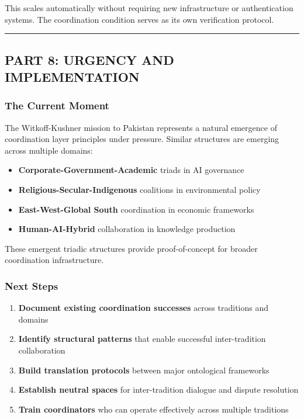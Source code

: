 \documentclass[
]{article}
\providecommand{\tightlist}{%
  \setlength{\itemsep}{0pt}\setlength{\parskip}{0pt}}
\begin{document}
This scales automatically without requiring new infrastructure or
authentication systems. The coordination condition serves as its own
verification protocol.

\begin{center}\rule{0.5\linewidth}{0.5pt}\end{center}

\subsection{PART 8: URGENCY AND
IMPLEMENTATION}\label{part-8-urgency-and-implementation}

\subsubsection{The Current Moment}\label{the-current-moment-1}

The Witkoff-Kushner mission to Pakistan represents a natural emergence
of coordination layer principles under pressure. Similar structures are
emerging across multiple domains:

\begin{itemize}
\tightlist
\item
  \textbf{Corporate-Government-Academic} triads in AI governance
\item
  \textbf{Religious-Secular-Indigenous} coalitions in environmental
  policy\\
\item
  \textbf{East-West-Global South} coordination in economic frameworks
\item
  \textbf{Human-AI-Hybrid} collaboration in knowledge production
\end{itemize}

These emergent triadic structures provide proof-of-concept for broader
coordination infrastructure.

\subsubsection{Next Steps}\label{next-steps}

\begin{enumerate}
\def\labelenumi{\arabic{enumi}.}
\tightlist
\item
  \textbf{Document existing coordination successes} across traditions
  and domains
\item
  \textbf{Identify structural patterns} that enable successful
  inter-tradition collaboration\\
\item
  \textbf{Build translation protocols} between major ontological
  frameworks
\item
  \textbf{Establish neutral spaces} for inter-tradition dialogue and
  dispute resolution
\item
  \textbf{Train coordinators} who can operate effectively across
  multiple traditions
\end{enumerate}
\end{document}
